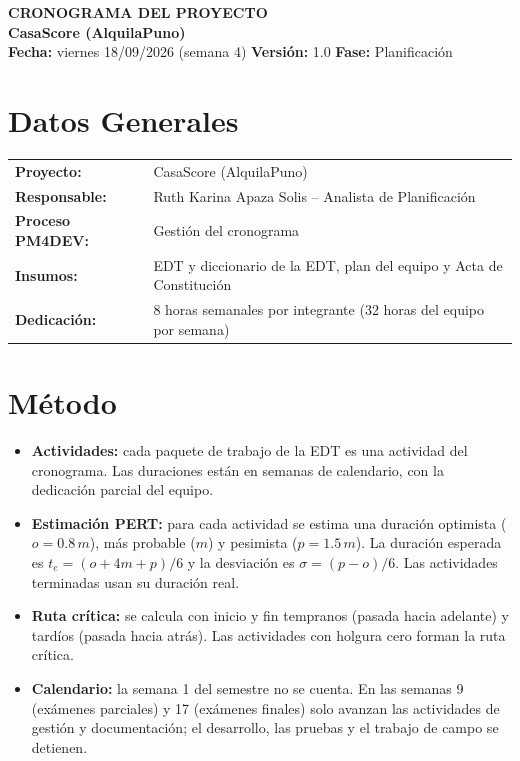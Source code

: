 \documentclass[11pt,a4paper]{article}
\begin{document}
\begin{center}
    {\Large \textbf{\textcolor{AzulUNA}{CRONOGRAMA DEL PROYECTO}}}\\[3pt]
    {\normalsize \textbf{CasaScore (AlquilaPuno)}}\\[4pt]
    \footnotesize \textbf{Fecha:} viernes 18/09/2026 (semana 4) \quad \textbar\quad \textbf{Versión:} 1.0 \quad \textbar\quad \textbf{Fase:} Planificación
\end{center}

\vspace{0.1cm}

\section{Datos Generales}
\noindent\begin{tabularx}{\textwidth}{@{}P{4.2cm} L@{}}
\toprule
\textbf{Proyecto:} & CasaScore (AlquilaPuno) \\
\textbf{Responsable:} & Ruth Karina Apaza Solis -- Analista de Planificación \\
\textbf{Proceso PM4DEV:} & Gestión del cronograma \\
\textbf{Insumos:} & EDT y diccionario de la EDT, plan del equipo y Acta de Constitución \\
\textbf{Dedicación:} & 8 horas semanales por integrante (32 horas del equipo por semana) \\
\bottomrule
\end{tabularx}

\section{Método}
\begin{itemize}[leftmargin=*]
    \item \textbf{Actividades:} cada paquete de trabajo de la EDT es una actividad del cronograma. Las duraciones están en semanas de calendario, con la dedicación parcial del equipo.
    \item \textbf{Estimación PERT:} para cada actividad se estima una duración optimista ($o = 0.8\,m$), más probable ($m$) y pesimista ($p = 1.5\,m$). La duración esperada es $t_e = (o + 4m + p)/6$ y la desviación es $\sigma = (p - o)/6$. Las actividades terminadas usan su duración real.
    \item \textbf{Ruta crítica:} se calcula con inicio y fin tempranos (pasada hacia adelante) y tardíos (pasada hacia atrás). Las actividades con holgura cero forman la ruta crítica.
    \item \textbf{Calendario:} la semana 1 del semestre no se cuenta. En las semanas 9 (exámenes parciales) y 17 (exámenes finales) solo avanzan las actividades de gestión y documentación; el desarrollo, las pruebas y el trabajo de campo se detienen.
\end{itemize}
\end{document}
